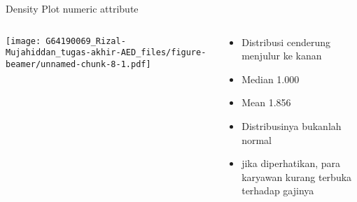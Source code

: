 \documentclass[
  ignorenonframetext,
]{beamer}
\providecommand{\tightlist}{%
  \setlength{\itemsep}{0pt}\setlength{\parskip}{0pt}}
\begin{document}
\begin{frame}{Density Plot numeric attribute}
\begin{columns}[T]
\begin{column}{0.48\textwidth}
\texttt{[image: G64190069\_Rizal-Mujahiddan\_tugas-akhir-AED\_files/figure-beamer/unnamed-chunk-8-1.pdf]}
\end{column}

\begin{column}{0.48\textwidth}
\begin{itemize}
\tightlist
\item
  Distribusi cenderung menjulur ke kanan
\item
  Median 1.000\\
\item
  Mean 1.856
\item
  Distribusinya bukanlah normal
\item
  jika diperhatikan, para karyawan kurang terbuka terhadap gajinya
\end{itemize}
\end{column}
\end{columns}
\end{frame}
\end{document}
